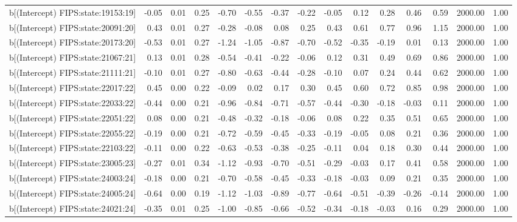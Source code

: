 \begin{table}[ht]
\begin{tabular}{rrrrrrrrrrrrrrr}
  b[(Intercept) FIPS:state:19153:19] & -0.05 & 0.01 & 0.25 & -0.70 & -0.55 & -0.37 & -0.22 & -0.05 & 0.12 & 0.28 & 0.46 & 0.59 & 2000.00 & 1.00 \\ 
  b[(Intercept) FIPS:state:20091:20] & 0.43 & 0.01 & 0.27 & -0.28 & -0.08 & 0.08 & 0.25 & 0.43 & 0.61 & 0.77 & 0.96 & 1.15 & 2000.00 & 1.00 \\ 
  b[(Intercept) FIPS:state:20173:20] & -0.53 & 0.01 & 0.27 & -1.24 & -1.05 & -0.87 & -0.70 & -0.52 & -0.35 & -0.19 & 0.01 & 0.13 & 2000.00 & 1.00 \\ 
  b[(Intercept) FIPS:state:21067:21] & 0.13 & 0.01 & 0.28 & -0.54 & -0.41 & -0.22 & -0.06 & 0.12 & 0.31 & 0.49 & 0.69 & 0.86 & 2000.00 & 1.00 \\ 
  b[(Intercept) FIPS:state:21111:21] & -0.10 & 0.01 & 0.27 & -0.80 & -0.63 & -0.44 & -0.28 & -0.10 & 0.07 & 0.24 & 0.44 & 0.62 & 2000.00 & 1.00 \\ 
  b[(Intercept) FIPS:state:22017:22] & 0.45 & 0.00 & 0.22 & -0.09 & 0.02 & 0.17 & 0.30 & 0.45 & 0.60 & 0.72 & 0.85 & 0.98 & 2000.00 & 1.00 \\ 
  b[(Intercept) FIPS:state:22033:22] & -0.44 & 0.00 & 0.21 & -0.96 & -0.84 & -0.71 & -0.57 & -0.44 & -0.30 & -0.18 & -0.03 & 0.11 & 2000.00 & 1.00 \\ 
  b[(Intercept) FIPS:state:22051:22] & 0.08 & 0.00 & 0.21 & -0.48 & -0.32 & -0.18 & -0.06 & 0.08 & 0.22 & 0.35 & 0.51 & 0.65 & 2000.00 & 1.00 \\ 
  b[(Intercept) FIPS:state:22055:22] & -0.19 & 0.00 & 0.21 & -0.72 & -0.59 & -0.45 & -0.33 & -0.19 & -0.05 & 0.08 & 0.21 & 0.36 & 2000.00 & 1.00 \\ 
  b[(Intercept) FIPS:state:22103:22] & -0.11 & 0.00 & 0.22 & -0.63 & -0.53 & -0.38 & -0.25 & -0.11 & 0.04 & 0.18 & 0.30 & 0.44 & 2000.00 & 1.00 \\ 
  b[(Intercept) FIPS:state:23005:23] & -0.27 & 0.01 & 0.34 & -1.12 & -0.93 & -0.70 & -0.51 & -0.29 & -0.03 & 0.17 & 0.41 & 0.58 & 2000.00 & 1.00 \\ 
  b[(Intercept) FIPS:state:24003:24] & -0.18 & 0.00 & 0.21 & -0.70 & -0.58 & -0.45 & -0.33 & -0.18 & -0.03 & 0.09 & 0.21 & 0.35 & 2000.00 & 1.00 \\ 
  b[(Intercept) FIPS:state:24005:24] & -0.64 & 0.00 & 0.19 & -1.12 & -1.03 & -0.89 & -0.77 & -0.64 & -0.51 & -0.39 & -0.26 & -0.14 & 2000.00 & 1.00 \\ 
  b[(Intercept) FIPS:state:24021:24] & -0.35 & 0.01 & 0.25 & -1.00 & -0.85 & -0.66 & -0.52 & -0.34 & -0.18 & -0.03 & 0.16 & 0.29 & 2000.00 & 1.00 \\ 

\end{tabular}
\end{table}
